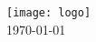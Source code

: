 \begin{titlepage}
\texttt{[image: logo]}\\[1cm]

\vspace{1 cm}
{\large \today}\\[3cm] %


\vfill %

\end{titlepage}

\afterpage{\blankpage}

